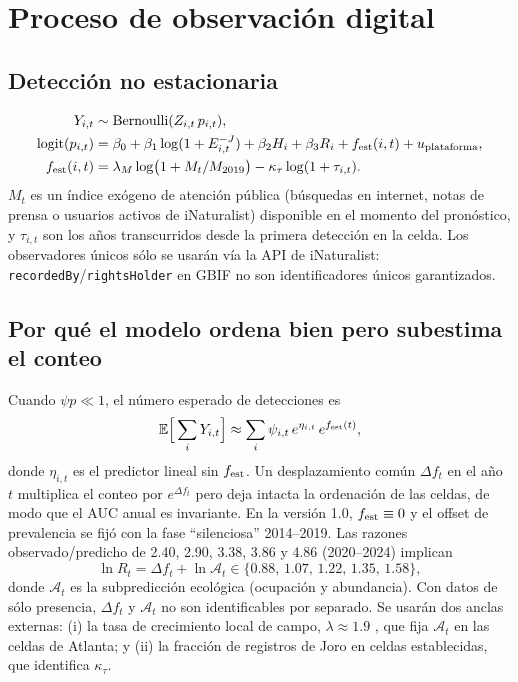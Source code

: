 \documentclass[11pt,letterpaper]{article}
\newcommand{\logit}{\operatorname{logit}}
\begin{document}
\section{Proceso de observación digital}
\label{sec:obs}
\subsection{Detección no estacionaria}
\begin{align}
Y_{i,t}&\sim\operatorname{Bernoulli}(Z_{i,t}\,p_{i,t}),\\
\logit(p_{i,t})&=\beta_0+\beta_1\log(1+E^{-J}_{i,t})+\beta_2H_i+\beta_3R_i+f_{\rm est}(i,t)+u_{\rm plataforma},\\
f_{\rm est}(i,t)&=\lambda_M\log\!\big(1+M_t/M_{2019}\big)-\kappa_\tau\log(1+\tau_{i,t}).\label{eq:fest}
\end{align}
$M_t$ es un índice exógeno de atención pública (búsquedas en internet, notas de prensa o usuarios activos de iNaturalist) disponible en el momento del pronóstico, y $\tau_{i,t}$ son los años transcurridos desde la primera detección en la celda. Los observadores únicos sólo se usarán vía la API de iNaturalist: \texttt{recordedBy}/\texttt{rightsHolder} en GBIF no son identificadores únicos garantizados.

\subsection{Por qué el modelo ordena bien pero subestima el conteo}
Cuando $\psi p\ll1$, el número esperado de detecciones es
\begin{equation}
\mathbb E\Big[\sum_iY_{i,t}\Big]\approx\sum_i\psi_{i,t}\,e^{\eta_{i,t}}\,e^{f_{\rm est}(t)},
\end{equation}
donde $\eta_{i,t}$ es el predictor lineal sin $f_{\rm est}$. Un desplazamiento común $\Delta f_t$ en el año $t$ multiplica el conteo por $e^{\Delta f_t}$ pero deja intacta la ordenación de las celdas, de modo que el AUC anual es invariante. En la versión 1.0, $f_{\rm est}\equiv0$ y el offset de prevalencia se fijó con la fase ``silenciosa'' 2014--2019. Las razones observado/predicho de 2.40, 2.90, 3.38, 3.86 y 4.86 (2020--2024) implican
\begin{equation}
\ln R_t=\Delta f_t+\ln\mathcal A_t\in\{0.88,\,1.07,\,1.22,\,1.35,\,1.58\},
\end{equation}
donde $\mathcal A_t$ es la subpredicción ecológica (ocupación y abundancia). Con datos de sólo presencia, $\Delta f_t$ y $\mathcal A_t$ no son identificables por separado. Se usarán dos anclas externas: (i) la tasa de crecimiento local de campo, $\lambda\approx1.9$ \cite{pemberton2025}, que fija $\mathcal A_t$ en las celdas de Atlanta; y (ii) la fracción de registros de Joro en celdas establecidas, que identifica $\kappa_\tau$.
\end{document}
